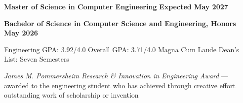 
 \hfill {}

\textbf{Master of Science in Computer Engineering} \hfill \textbf{Expected May 2027}

\vspace{0.3em}

 \hfill {}

\textbf{Bachelor of Science in Computer Science and Engineering, Honors} \hfill \textbf{May 2026}

Engineering GPA: 3.92/4.0 \textbullet{} Overall GPA: 3.71/4.0 \textbullet{} Magna Cum Laude \textbullet{} Dean's List: Seven Semesters

\textit{James M. Pommersheim Research \& Innovation in Engineering Award} --- awarded to the engineering student who has achieved through creative effort outstanding work of scholarship or invention
